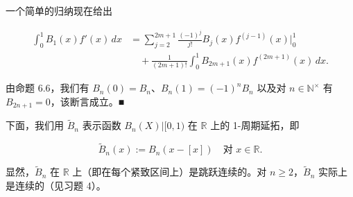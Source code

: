 \begin{lemma}
一个简单的归纳现在给出

\begin{equation*}
\begin{aligned}
\int_0^1 B_1(x)f'(x)\,dx &= \sum_{j=2}^{2m+1}\frac{(-1)^j}{j!}B_j(x)f^{(j-1)}(x)\Big|_0^1 \\ &\quad + \frac{1}{(2m+1)!}\int_0^1 B_{2m+1}(x)f^{(2m+1)}(x)\,dx .
\end{aligned}
\end{equation*}

由命题 6.6，我们有 $ B_n(0) = B_n $、$ B_n(1) = (-1)^n B_n $ 以及对 $ n \in \mathbb{N}^\times $ 有 $ B_{2n+1} = 0 $，该断言成立。\nobreak\hspace{0.35em}■

\end{lemma}

下面，我们用 $ \widetilde{B}_n $ 表示函数 $ B_n(X)|[0, 1) $ 在 $ \mathbb{R} $ 上的 1-周期延拓，即

\[
\widetilde{B}_n(x) := B_n(x - [x]) \quad \text{对 } x \in \mathbb{R} .
\]

显然，$ \widetilde{B}_n $ 在 $ \mathbb{R} $ 上（即在每个紧致区间上）是跳跃连续的。对 $ n \ge 2 $，$ \widetilde{B}_n $ 实际上是连续的（见习题 4）。

